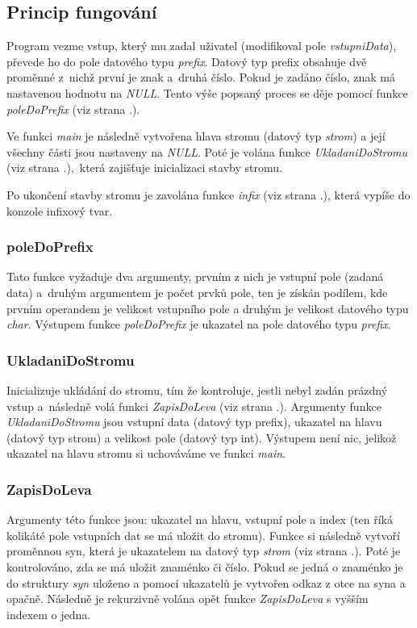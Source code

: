 \documentclass[12pt,a4paper]{report}
\begin{document}
\subsection{Princip fungování}
Program vezme vstup, který mu zadal uživatel (modifikoval pole \textit{vstupniData}), převede ho do pole datového typu \textit{prefix}. Datový typ prefix obsahuje dvě proměnné z~nichž první je znak a~druhá číslo. Pokud je zadáno číslo, znak má nastavenou hodnotu na \textit{NULL}. Tento výše popsaný proces se děje pomocí funkce \textit{poleDoPrefix} (viz strana \pageref{pDP}.).

Ve funkci \textit{main} je následně vytvořena hlava stromu (datový typ \textit{strom}) a její všechny části jsou nastaveny na \textit{NULL}. Poté je volána funkce \textit{UkladaniDoStromu} (viz strana \pageref{UDS}.),~která zajišťuje inicializaci stavby stromu.

Po ukončení stavby stromu je zavolána funkce \textit{infix} (viz strana \pageref{infix}.), která vypíše do konzole infixový tvar. 


\subsubsection{poleDoPrefix} \label{pDP}
Tato funkce vyžaduje dva argumenty, prvním z nich je vstupní pole (zadaná data) a~druhým argumentem je počet prvků pole, ten je získán podílem, kde prvním operandem je velikost vstupního pole a druhým je velikost datového typu \textit{char}. Výstupem funkce \textit{poleDoPrefix} je ukazatel na  pole datového typu \textit{prefix}.

\subsubsection{UkladaniDoStromu} \label{UDS}
Inicializuje ukládání do stromu, tím že kontroluje, jestli nebyl zadán prázdný vstup a~následně volá funkci \textit{ZapisDoLeva} (viz strana \pageref{ZDL}.). Argumenty funkce \textit{UkladaniDoStromu} jsou vstupní data (datový typ prefix), ukazatel na hlavu (datový typ strom) a velikost pole (datový typ int). Výstupem není nic, jelikož ukazatel na hlavu stromu si uchováváme ve funkci \textit{main}.

\subsubsection{ZapisDoLeva} \label{ZDL}
Argumenty této funkce jsou: ukazatel na hlavu, vstupní pole a index (ten říká kolikáté pole vstupních dat se má uložit do stromu). Funkce si následně vytvoří proměnnou syn, která je ukazatelem na datový typ \textit{strom} (viz strana \pageref{strom}.). Poté je kontrolováno, zda se má uložit znaménko či číslo. Pokud se jedná o znaménko je do struktury \textit{syn} uloženo a pomocí ukazatelů je vytvořen odkaz z otce na syna a opačně. Následně je rekurzivně volána opět funkce \textit{ZapisDoLeva} s vyšším indexem o jedna. 
\end{document}
